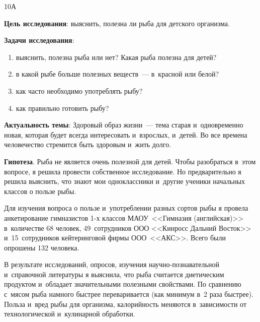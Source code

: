 


\makeProcTitleSchool


10А

\textbf{Цель исследования}: выяснить, полезна ли рыба для детского организма.

\textbf{Задачи исследования}:
\begin{enumerate}[noitemsep]\vspace{-8pt}
\item выяснить, полезна рыба или нет? Какая рыба полезна для детей?
\item в какой рыбе больше полезных веществ~--- в~красной или белой?
\item как часто необходимо употреблять рыбу?
\item как правильно готовить рыбу?
\end{enumerate}\vspace{-8pt}

\textbf{Актуальность темы}: Здоровый образ жизни~--- тема старая и~одновременно новая, которая будет всегда интересовать и~взрослых, и~детей. Во все времена человечество стремится быть здоровым и~жить долго.

\textbf{Гипотеза}. Рыба не является очень полезной для детей. Чтобы разобраться в~этом вопросе, я решила провести собственное исследование. Но предварительно я решила выяснить, что знают мои одноклассники и~другие ученики начальных классов о пользе рыбы.

Для изучения вопроса о пользе и~употреблении разных сортов рыбы я провела анкетирование гимназистов 1-х классов МАОУ~<<Гимназия (английская)>> в~количестве 68 человек, 49~сотрудников ООО <<Кинросс Дальний Восток>> и~15~сотрудников кейтеринговой фирмы ООО~<<АКС>>. Всего были опрошены 132 человека.

В результате исследований, опросов, изучения научно-познавательной и~справочной литературы я выяснила, что рыба считается диетическим продуктом и~обладает значительными полезными свойствами. По сравнению с~мясом рыба намного быстрее переваривается (как минимум в~2 раза быстрее). Польза и~вред рыбы для организма, калорийность меняются в~зависимости от технологической и~кулинарной обработки.

